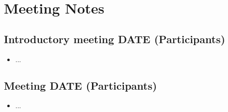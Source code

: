 \chapter{Meeting Notes}




\section{
    Introductory meeting DATE (Participants)
}

\begin{itemize}
    \item ...
\end{itemize}


\clearpage\newpage


\section{
    Meeting DATE (Participants)
}

\begin{itemize}
    \item ...
\end{itemize}


\clearpage\newpage
